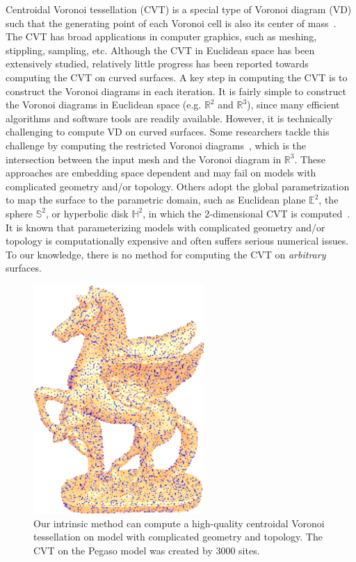 Centroidal Voronoi tessellation (CVT) is a special type of Voronoi
diagram (VD) such that the generating point of each Voronoi cell is
also its center of mass~\cite{Du:1999:CVT:340312.340319}. The CVT
has broad applications in computer graphics, such as meshing,
stippling, sampling, etc. Although the CVT in Euclidean space has
been extensively studied, relatively little progress has been
reported towards computing the CVT on curved surfaces. A key step in
computing the CVT is to construct the Voronoi diagrams in each
iteration. It is fairly simple to construct the
 Voronoi diagrams in Euclidean space (e.g. $\mathbb{R}^2$ and
$\mathbb{R}^3$), since many efficient algorithms and software tools
are readily available. However, it is technically challenging to
compute VD on curved surfaces. Some researchers tackle this
challenge by computing the restricted Voronoi
diagrams~\cite{DBLP:journals/cgf/YanLLSW09}, which is the
intersection between the input mesh and the Voronoi diagram in
$\mathbb{R}^3$. These approaches are embedding space dependent and
may fail on models with complicated geometry and/or topology. Others
adopt the global parametrization to map the surface to the
parametric domain, such as Euclidean plane $\mathbb{E}^2$, the
sphere $\mathbb{S}^2$,  or hyperbolic disk $\mathbb{H}^{2}$, in
which the 2-dimensional CVT is
computed~\cite{DBLP:journals/cad/ShuaiGJ13}. It is known that
parameterizing models with complicated geometry and/or topology is
computationally expensive and often suffers serious numerical
issues. To our knowledge, there is no method for computing the CVT
on \textit{arbitrary} surfaces.

  \begin{figure}[htbp]
  \centering
  \includegraphics[width=2.550in]{figs/cvt/pegaso_nf667k_seed3000_small_whole_new.png}
  \caption{Our intrinsic method can compute a high-quality centroidal Voronoi tessellation on model with complicated geometry and topology. The CVT on the Pegaso model was created by 3000 sites. }
  \label{fig:teaser}
  \end{figure}

